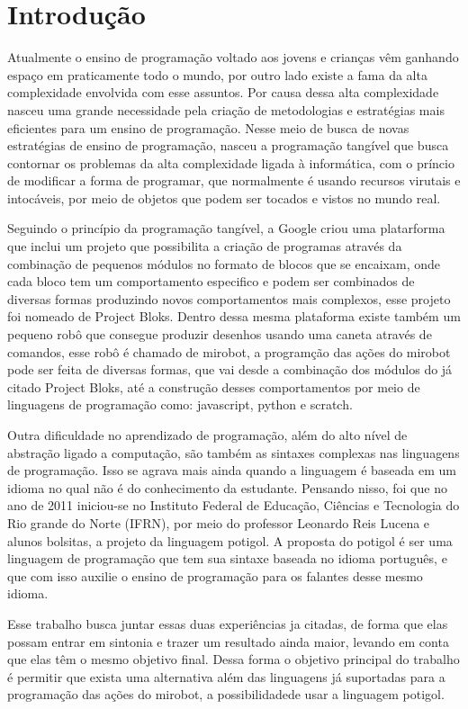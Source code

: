 \chapter{Introdução}
\label{cap:introducao}

Atualmente o ensino de programação voltado aos jovens e crianças vêm ganhando
espaço em praticamente todo o mundo, por outro lado existe a fama da alta
complexidade envolvida com esse assuntos. Por causa dessa alta complexidade
nasceu uma grande necessidade pela criação de metodologias e estratégias mais
eficientes para um ensino de programação.  Nesse meio de busca de novas
estratégias de ensino de programação, nasceu a programação tangível que busca
contornar os problemas da alta complexidade ligada à informática, com o príncio
de modificar a forma de programar, que normalmente é usando recursos virutais e
intocáveis, por meio  de objetos que podem ser tocados e vistos no mundo real.

Seguindo o princípio da programação tangível, a Google criou uma platarforma
que inclui um projeto que possibilita a criação de programas através da
combinação de pequenos módulos no formato de blocos que se encaixam, onde cada
bloco tem um comportamento especifico e podem ser combinados de diversas formas
produzindo novos comportamentos mais complexos, esse projeto foi nomeado de
Project Bloks. Dentro dessa mesma plataforma existe também um pequeno robô que
consegue produzir desenhos usando uma caneta através de comandos, esse robô é
chamado de mirobot, a programção das ações do mirobot pode ser feita de
diversas formas, que vai desde a combinação dos módulos do já citado Project
Bloks, até a construção desses comportamentos por meio de linguagens de
programação como: javascript, python e scratch.

Outra dificuldade no aprendizado de programação, além do alto nível de
abstração ligado a computação, são também as sintaxes complexas nas linguagens
de programação. Isso se agrava mais ainda quando a linguagem é baseada em um
idioma no qual não é do conhecimento da estudante. Pensando nisso, foi que no
ano de 2011 iniciou-se no Instituto Federal de Educação, Ciências e Tecnologia
do Rio grande do Norte (IFRN), por meio do professor Leonardo Reis Lucena e
alunos bolsitas, a projeto da linguagem potigol. A proposta do potigol é ser
uma linguagem de programação que tem sua sintaxe baseada no idioma português, e
que com isso auxilie o ensino de programação para os falantes desse mesmo
idioma.

Esse trabalho busca juntar essas duas experiências ja citadas, de forma que
elas possam entrar em sintonia e trazer um resultado ainda maior, levando em
conta que elas têm o mesmo objetivo final. Dessa forma o objetivo principal do
trabalho é permitir que exista uma alternativa além das linguagens já
suportadas para a programação das ações do mirobot, a possibilidadede usar a
linguagem potigol.

